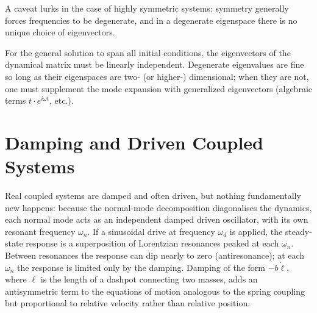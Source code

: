 A caveat lurks in the case of highly symmetric systems: symmetry generally forces frequencies to be degenerate, and in a degenerate eigenspace there is no unique choice of eigenvectors.

\begin{fact}
For the general solution to span all initial conditions, the eigenvectors of the dynamical matrix must be linearly independent. Degenerate eigenvalues are fine so long as their eigenspaces are two- (or higher-) dimensional; when they are not, one must supplement the mode expansion with generalized eigenvectors (algebraic terms $t \cdot e^{i\omega t}$, etc.).
\end{fact}

\section{Damping and Driven Coupled Systems}

Real coupled systems are damped and often driven, but nothing fundamentally new happens: because the normal-mode decomposition diagonalises the dynamics, each normal mode acts as an independent damped driven oscillator, with its own resonant frequency $\omega_n$. If a sinusoidal drive at frequency $\omega_d$ is applied, the steady-state response is a superposition of Lorentzian resonances peaked at each $\omega_n$. Between resonances the response can dip nearly to zero (antiresonance); at each $\omega_n$ the response is limited only by the damping. Damping of the form $-b\dot{\ell}$, where $\ell$ is the length of a dashpot connecting two masses, adds an antisymmetric term to the equations of motion analogous to the spring coupling but proportional to relative velocity rather than relative position.
